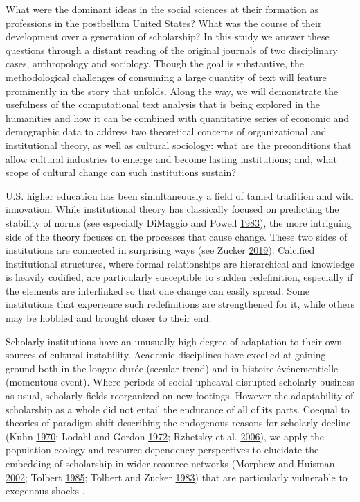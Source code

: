 \documentclass[]{book}
\theoremstyle{definition}
\theoremstyle{definition}
\theoremstyle{definition}
\theoremstyle{remark}
\begin{document}
What were the dominant ideas in the social sciences at their formation
as professions in the postbellum United States? What was the course of
their development over a generation of scholarship? In this study we
answer these questions through a distant reading of the original
journals of two disciplinary cases, anthropology and sociology. Though
the goal is substantive, the methodological challenges of consuming a
large quantity of text will feature prominently in the story that
unfolds. Along the way, we will demonstrate the usefulness of the
computational text analysis that is being explored in the humanities and
how it can be combined with quantitative series of economic and
demographic data to address two theoretical concerns of organizational
and institutional theory, as well as cultural sociology: what are the
preconditions that allow cultural industries to emerge and become
lasting institutions; and, what scope of cultural change can such
institutions sustain?

U.S. higher education has been simultaneously a field of tamed tradition
and wild innovation. While institutional theory has classically focused
on predicting the stability of norms (see especially DiMaggio and Powell
\protect\hyperlink{ref-DiMaggio1983Iron}{1983}), the more intriguing
side of the theory focuses on the processes that cause change. These two
sides of institutions are connected in surprising ways (see Zucker
\protect\hyperlink{ref-Zucker2019Institutional}{2019}). Calcified
institutional structures, where formal relationships are hierarchical
and knowledge is heavily codified, are particularly susceptible to
sudden redefinition, especially if the elements are interlinked so that
one change can easily spread. Some institutions that experience such
redefinitions are strengthened for it, while others may be hobbled and
brought closer to their end.

Scholarly institutions have an unusually high degree of adaptation to
their own sources of cultural instability. Academic disciplines have
excelled at gaining ground both in the longue durée (secular trend) and
in histoire événementielle (momentous event). Where periods of social
upheaval disrupted scholarly business as usual, scholarly fields
reorganized on new footings. However the adaptability of scholarship as
a whole did not entail the endurance of all of its parts. Coequal to
theories of paradigm shift describing the endogenous reasons for
scholarly decline (Kuhn \protect\hyperlink{ref-Kuhn1970Structure}{1970};
Lodahl and Gordon \protect\hyperlink{ref-Lodahl1972Structure}{1972};
Rzhetsky et al.
\protect\hyperlink{ref-Rzhetsky2006Microparadigms}{2006}), we apply the
population ecology and resource dependency perspectives to elucidate the
embedding of scholarship in wider resource networks (Morphew and Huisman
\protect\hyperlink{ref-Morphew2002Using}{2002}; Tolbert
\protect\hyperlink{ref-Tolbert1985Institutional}{1985}; Tolbert and
Zucker \protect\hyperlink{ref-Tolbert1983Institutional}{1983}) that are
particularly vulnerable to exogenous shocks .
\end{document}
